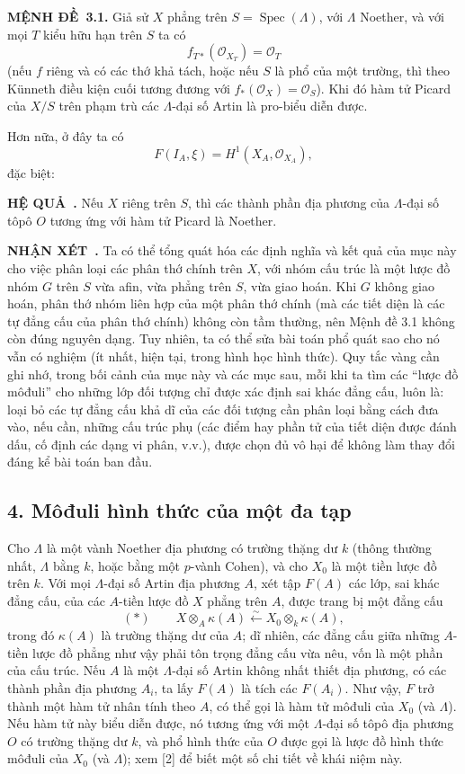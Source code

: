 \documentclass[11pt,twoside,openany]{book}
\numberwithin{equation}{section}
\newcommand{\src}[1]{%
  \phantomsection\hypertarget{src:\fgasourceid:#1}{}%
  \marginpar{\raggedleft\footnotesize\sffamily #1}%
}
\newcommand{\fgasourceid}{unset}
\newcommand{\result}[2]{\par\medskip\noindent\textbf{#1\if\relax\detokenize{#2}\relax\else\ #2\fi.}\quad}
\begin{document}
\src{384}
\result{MỆNH ĐỀ}{3.1} Giả sử $X$ phẳng trên
$S=\operatorname{Spec}(\Lambda)$, với $\Lambda$ Noether, và với mọi $T$ kiểu
hữu hạn trên $S$ ta có
\[
  f_{T*}(\mathcal O_{X_T})=\mathcal O_T
\]
(nếu $f$ riêng và có các thớ khả tách, hoặc nếu $S$ là phổ của một trường,
thì theo Künneth điều kiện cuối tương đương với
$f_*(\mathcal O_X)=\mathcal O_S$). Khi đó hàm tử Picard của $X/S$ trên phạm
trù các $\Lambda$-đại số Artin là pro-biểu diễn được.

Hơn nữa, ở đây ta có
\[
  F(I_A,\xi)=H^1(X_A,\mathcal O_{X_A}),
\]
đặc biệt:

\result{HỆ QUẢ}{} Nếu $X$ riêng trên $S$, thì các thành phần địa phương của
$\Lambda$-đại số tôpô $O$ tương ứng với hàm tử Picard là Noether.

\result{NHẬN XÉT}{} Ta có thể tổng quát hóa các định nghĩa và kết quả của mục
này cho việc phân loại các phân thớ chính trên $X$, với nhóm cấu trúc là một
lược đồ nhóm $G$ trên $S$ vừa afin, vừa phẳng trên $S$, vừa giao hoán. Khi $G$
không giao hoán, phân thớ nhóm liên hợp của một phân thớ chính (mà các tiết
diện là các tự đẳng cấu của phân thớ chính) không còn tầm thường, nên Mệnh đề
3.1 không còn đúng nguyên dạng. Tuy nhiên, ta có thể sửa bài toán phổ quát sao
cho nó vẫn có nghiệm (ít nhất, hiện tại, trong hình học hình thức). Quy tắc
vàng cần ghi nhớ, trong bối cảnh của \src{385}mục này và các mục sau, mỗi khi
ta tìm các ``lược đồ môđuli'' cho những lớp đối tượng chỉ được xác định sai
khác đẳng cấu, luôn là: loại bỏ các tự đẳng cấu khả dĩ của các đối tượng cần
phân loại bằng cách đưa vào, nếu cần, những cấu trúc phụ (các điểm hay phần tử
của tiết diện được đánh dấu, cố định các dạng vi phân, v.v.), được chọn đủ vô
hại để không làm thay đổi đáng kể bài toán ban đầu.

\subsection*{4. Môđuli hình thức của một đa tạp}

Cho $\Lambda$ là một vành Noether địa phương có trường thặng dư $k$ (thông
thường nhất, $\Lambda$ bằng $k$, hoặc bằng một $p$-vành Cohen), và cho $X_0$
là một tiền lược đồ trên $k$. Với mọi $\Lambda$-đại số Artin địa phương $A$,
xét tập $F(A)$ các lớp, sai khác đẳng cấu, của các $A$-tiền lược đồ $X$ phẳng
trên $A$, được trang bị một đẳng cấu
\[
  (*)\qquad
  X\otimes_A\kappa(A)\xleftarrow{\sim}
  X_0\otimes_k\kappa(A),
\]
trong đó $\kappa(A)$ là trường thặng dư của $A$; dĩ nhiên, các đẳng cấu giữa
những $A$-tiền lược đồ phẳng như vậy phải tôn trọng đẳng cấu vừa nêu, vốn là
một phần của cấu trúc. Nếu $A$ là một $\Lambda$-đại số Artin không nhất thiết
địa phương, có các thành phần địa phương $A_i$, ta lấy $F(A)$ là tích các
$F(A_i)$. Như vậy, $F$ trở thành một hàm tử nhân tính theo $A$, có thể gọi là
hàm tử môđuli của $X_0$ (và $\Lambda$). Nếu hàm tử này biểu diễn được, nó tương
ứng với một $\Lambda$-đại số tôpô địa phương $O$ có trường thặng dư $k$, và
phổ hình thức của $O$ được gọi là lược đồ hình thức môđuli của $X_0$ (và
$\Lambda$); xem [2] để biết một số chi tiết về khái niệm này.
\end{document}
